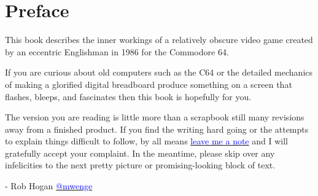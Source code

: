 \chapter{Preface} 
This book describes the inner workings of a relatively obscure video game created
by an eccentric Englishman in 1986 for the Commodore 64.

If you are curious about old computers such as the C64 or the detailed mechanics
of making a glorified digital breadboard produce something on a screen that flashes, bleeps,
and fascinates then this book is hopefully for you.

The version you are reading is little more than a scrapbook still many revisions away from a
finished product. If you find the writing hard going or the attempts to explain things difficult
to follow, by all means \href{https://github.com/mwenge/iatheory/issues}{\textcolor{blue}{leave me a note}} and
I will gratefully accept your complaint. In the meantime, please skip over any infelicities
to the next pretty picture or promising-looking block of text.

- Rob Hogan \href{https://mastodon.social/@mwenge}{\textcolor{blue}{@mwenge}}
